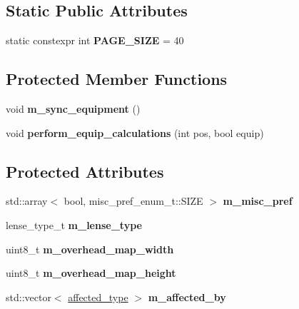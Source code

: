 \subsection*{Static Public Attributes}
\begin{DoxyCompactItemize}
\item 
\mbox{\label{classmods_1_1player_aaf1125ed813eb65509e04724182ac6d0}} 
static constexpr int {\bfseries P\+A\+G\+E\+\_\+\+S\+I\+ZE} = 40
\end{DoxyCompactItemize}
\subsection*{Protected Member Functions}
\begin{DoxyCompactItemize}
\item 
\mbox{\label{classmods_1_1player_a0af7899634f32acfecdfe05dced66ac1}} 
void {\bfseries m\+\_\+sync\+\_\+equipment} ()
\item 
\mbox{\label{classmods_1_1player_ac69cc3d275e1df592b20ee19d072de56}} 
void {\bfseries perform\+\_\+equip\+\_\+calculations} (int pos, bool equip)
\end{DoxyCompactItemize}
\subsection*{Protected Attributes}
\begin{DoxyCompactItemize}
\item 
\mbox{\label{classmods_1_1player_a3f506528f2633149d6577a628b4fa86a}} 
std\+::array$<$ bool, misc\+\_\+pref\+\_\+enum\+\_\+t\+::\+S\+I\+ZE $>$ {\bfseries m\+\_\+misc\+\_\+pref}
\item 
\mbox{\label{classmods_1_1player_a61668c66280f178e14b5aac9f6f7bf2d}} 
lense\+\_\+type\+\_\+t {\bfseries m\+\_\+lense\+\_\+type}
\item 
\mbox{\label{classmods_1_1player_aea958890ec05b191ee9c3df20d406a04}} 
uint8\+\_\+t {\bfseries m\+\_\+overhead\+\_\+map\+\_\+width}
\item 
\mbox{\label{classmods_1_1player_a74c1aa460bf10298e04df0819de4976d}} 
uint8\+\_\+t {\bfseries m\+\_\+overhead\+\_\+map\+\_\+height}
\item 
\mbox{\label{classmods_1_1player_a815275e6ade43c0c7841e3978f4aaec4}} 
std\+::vector$<$ \hyperlink{structaffected__type}{affected\+\_\+type} $>$ {\bfseries m\+\_\+affected\+\_\+by}
\end{DoxyCompactItemize}
